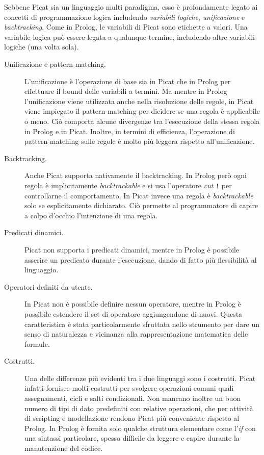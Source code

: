 \documentclass[12pt,a4paper,openright]{book}  %
\begin{document}
Sebbene Picat sia un linguaggio multi paradigma, esso è profondamente
legato ai concetti di programmazione logica includendo \emph{variabili
  logiche}, \emph{unificazione} e \emph{backtracking}.  Come in
Prolog, le variabili di Picat sono etichette a valori. Una variabile
logica può essere legata a qualunque termine, includendo altre
variabili logiche (una volta sola).

\begin{description}
\item[Unificazione e pattern-matching.] L'unificazione è l'operazione
  di base sia in Picat che in Prolog per effettuare il bound delle
  variabili a termini. Ma mentre in Prolog l'unificazione viene
  utilizzata anche nella risoluzione delle regole, in Picat viene
  impiegato il pattern-matching per dicidere se una regola è
  applicabile o meno. Ciò comporta alcune divergenze tra l'esecuzione
  della stessa regola in Prolog e in Picat.  Inoltre, in termini di
  efficienza, l'operazione di pattern-matching sulle regole è molto
  più leggera rispetto all'unificazione.
\item[Backtracking.] Anche Picat supporta nativamente il
  backtracking. In Prolog però ogni regola è implicitamente
  \emph{backtrackable} e si usa l'operatore \emph{cut} \verb|!| per
  controllarne il comportamento. In Picat invece una regola è
  \emph{backtrackable} solo se esplicitamente dichiarato. Ciò permette
  al programmatore di capire a colpo d'occhio l'intenzione di una
  regola.
\item[Predicati dinamici.] Picat non supporta i predicati dinamici,
  mentre in Prolog è possibile asserire un predicato durante
  l'esecuzione, dando di fatto più flessibilità al linguaggio.
\item[Operatori definiti da utente.] In Picat non è possibile definire
  nessun operatore, mentre in Prolog è possibile estendere il set di
  operatore aggiungendone di nuovi. Questa caratteristica è stata
  particolarmente sfruttata nello strumento \setlog per dare un senso
  di naturalezza e vicinanza alla rappresentazione matematica delle
  formule.
\item[Costrutti.] Una delle differenze più evidenti tra i due
  linguaggi sono i costrutti. Picat infatti fornisce molti costrutti
  per svolgere operazioni comuni quali assegnamenti, cicli e salti
  condizionali. Non mancano inoltre un buon numero di tipi di dato
  predefiniti con relative operazioni, che per attività di scripting e
  modellazione rendono Picat più conveniente rispetto al Prolog. In
  Prolog è fornita solo qualche struttura elementare come l'\emph{if}
  con una sintassi particolare, spesso difficile da leggere e capire
  durante la manutenzione del codice.
\end{description}
\end{document}
